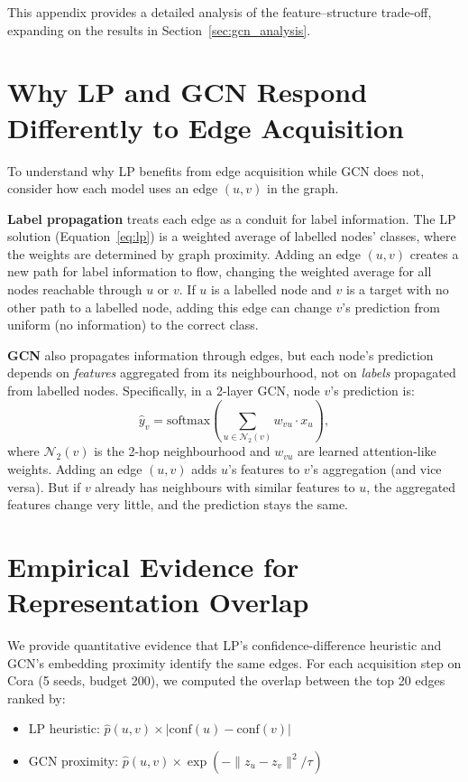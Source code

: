 \documentclass[12pt,a4paper,oneside]{report}
\begin{document}
This appendix provides a detailed analysis of the feature--structure trade-off, expanding on the results in Section~\ref{sec:gcn_analysis}.

\section{Why LP and GCN Respond Differently to Edge Acquisition}

To understand why LP benefits from edge acquisition while GCN does not, consider how each model uses an edge $(u, v)$ in the graph.

\textbf{Label propagation} treats each edge as a conduit for label information. The LP solution (Equation~\ref{eq:lp}) is a weighted average of labelled nodes' classes, where the weights are determined by graph proximity. Adding an edge $(u, v)$ creates a new path for label information to flow, changing the weighted average for all nodes reachable through $u$ or $v$. If $u$ is a labelled node and $v$ is a target with no other path to a labelled node, adding this edge can change $v$'s prediction from uniform (no information) to the correct class.

\textbf{GCN} also propagates information through edges, but each node's prediction depends on \emph{features} aggregated from its neighbourhood, not on \emph{labels} propagated from labelled nodes. Specifically, in a 2-layer GCN, node $v$'s prediction is:
\begin{equation}
    \hat{y}_v = \text{softmax}\!\left(\sum_{u \in \mathcal{N}_2(v)} w_{vu} \cdot x_u\right),
\end{equation}
where $\mathcal{N}_2(v)$ is the 2-hop neighbourhood and $w_{vu}$ are learned attention-like weights. Adding an edge $(u, v)$ adds $u$'s features to $v$'s aggregation (and vice versa). But if $v$ already has neighbours with similar features to $u$, the aggregated features change very little, and the prediction stays the same.

\section{Empirical Evidence for Representation Overlap}

We provide quantitative evidence that LP's confidence-difference heuristic and GCN's embedding proximity identify the same edges. For each acquisition step on Cora (5 seeds, budget 200), we computed the overlap between the top 20 edges ranked by:
\begin{itemize}[leftmargin=2em]
    \item LP heuristic: $\hat{p}(u,v) \times |\text{conf}(u) - \text{conf}(v)|$
    \item GCN proximity: $\hat{p}(u,v) \times \exp(-\|z_u - z_v\|^2 / \tau)$
\end{itemize}
\end{document}
